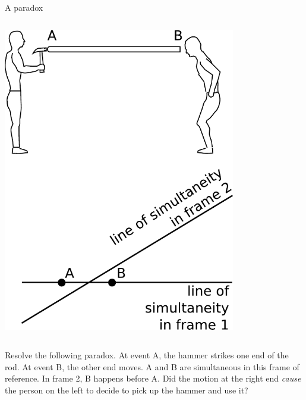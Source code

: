 \begin{frame}{A paradox}
  \begin{mycolumns}

    \begin{column}{.5\textwidth}\includegraphics[width=4in]{ch02/figs/pole-paradox}\end{column}

    \begin{column}{.5\textwidth}
      \dq

      Resolve the following paradox.
      At event A, the hammer strikes one end of the rod.
      At event B, the other end moves. A and B are simultaneous in this frame of reference.
      In frame 2, B happens before A. Did the motion at the right end \emph{cause}
      the person on the left to decide to pick up the hammer and use it?

    \end{column}
  \end{mycolumns}


\end{frame}

